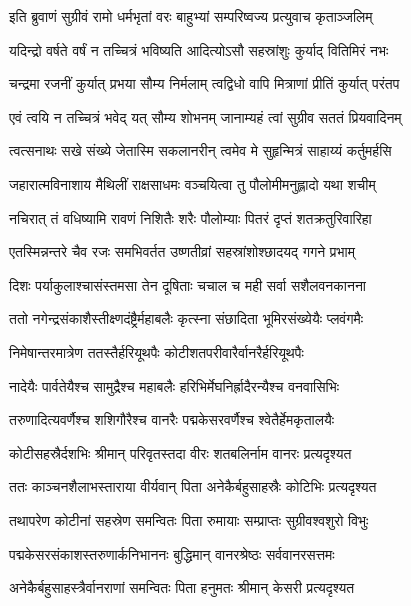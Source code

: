 
\twolineshloka
{इति ब्रुवाणं सुग्रीवं रामो धर्मभृतां वरः}
{बाहुभ्यां सम्परिष्वज्य प्रत्युवाच कृताञ्जलिम्} %

\twolineshloka
{यदिन्द्रो वर्षते वर्षं न तच्चित्रं भविष्यति}
{आदित्योऽसौ सहस्रांशुः कुर्याद् वितिमिरं नभः} %

\twolineshloka
{चन्द्रमा रजनीं कुर्यात् प्रभया सौम्य निर्मलाम्}
{त्वद्विधो वापि मित्राणां प्रीतिं कुर्यात् परंतप} %

\twolineshloka
{एवं त्वयि न तच्चित्रं भवेद् यत् सौम्य शोभनम्}
{जानाम्यहं त्वां सुग्रीव सततं प्रियवादिनम्} %

\twolineshloka
{त्वत्सनाथः सखे संख्ये जेतास्मि सकलानरीन्}
{त्वमेव मे सुहृन्मित्रं साहाय्यं कर्तुमर्हसि} %

\twolineshloka
{जहारात्मविनाशाय मैथिलीं राक्षसाधमः}
{वञ्चयित्वा तु पौलोमीमनुह्लादो यथा शचीम्} %

\twolineshloka
{नचिरात् तं वधिष्यामि रावणं निशितैः शरैः}
{पौलोम्याः पितरं दृप्तं शतक्रतुरिवारिहा} %

\twolineshloka
{एतस्मिन्नन्तरे चैव रजः समभिवर्तत}
{उष्णतीव्रां सहस्रांशोश्छादयद् गगने प्रभाम्} %

\twolineshloka
{दिशः पर्याकुलाश्चासंस्तमसा तेन दूषिताः}
{चचाल च मही सर्वा सशैलवनकानना} %

\twolineshloka
{ततो नगेन्द्रसंकाशैस्तीक्ष्णदंष्ट्रैर्महाबलैः}
{कृत्स्ना संछादिता भूमिरसंख्येयैः प्लवंगमैः} %

\twolineshloka
{निमेषान्तरमात्रेण ततस्तैर्हरियूथपैः}
{कोटीशतपरीवारैर्वानरैर्हरियूथपैः} %

\twolineshloka
{नादेयैः पार्वतेयैश्च सामुद्रैश्च महाबलैः}
{हरिभिर्मेघनिर्ह्रादैरन्यैश्च वनवासिभिः} %

\twolineshloka
{तरुणादित्यवर्णैश्च शशिगौरैश्च वानरैः}
{पद्मकेसरवर्णैश्च श्वेतैर्हेमकृतालयैः} %

\twolineshloka
{कोटीसहस्रैर्दशभिः श्रीमान् परिवृतस्तदा}
{वीरः शतबलिर्नाम वानरः प्रत्यदृश्यत} %

\twolineshloka
{ततः काञ्चनशैलाभस्ताराया वीर्यवान् पिता}
{अनेकैर्बहुसाहस्रैः कोटिभिः प्रत्यदृश्यत} %

\twolineshloka
{तथापरेण कोटीनां सहस्रेण समन्वितः}
{पिता रुमायाः सम्प्राप्तः सुग्रीवश्वशुरो विभुः} %

\twolineshloka
{पद्मकेसरसंकाशस्तरुणार्कनिभाननः}
{बुद्धिमान् वानरश्रेष्ठः सर्ववानरसत्तमः} %

\twolineshloka
{अनेकैर्बहुसाहस्त्रैर्वानराणां समन्वितः}
{पिता हनुमतः श्रीमान् केसरी प्रत्यदृश्यत} %

